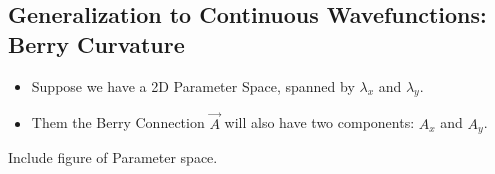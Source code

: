 \documentclass[11pt]{article}
\begin{document}
\vskip 1cm
\subsection{Generalization to Continuous Wavefunctions: Berry Curvature}

\begin{itemize}
  \item Suppose we have a 2D Parameter Space, spanned by $\lambda_x$ and $\lambda_y$.
  \item Them the Berry  Connection $\vec{A}$ will also have two components: $A_x$ and $A_y$.
\end{itemize}

\begin{center}
  Include figure of Parameter space.
\end{center}
\end{document}
